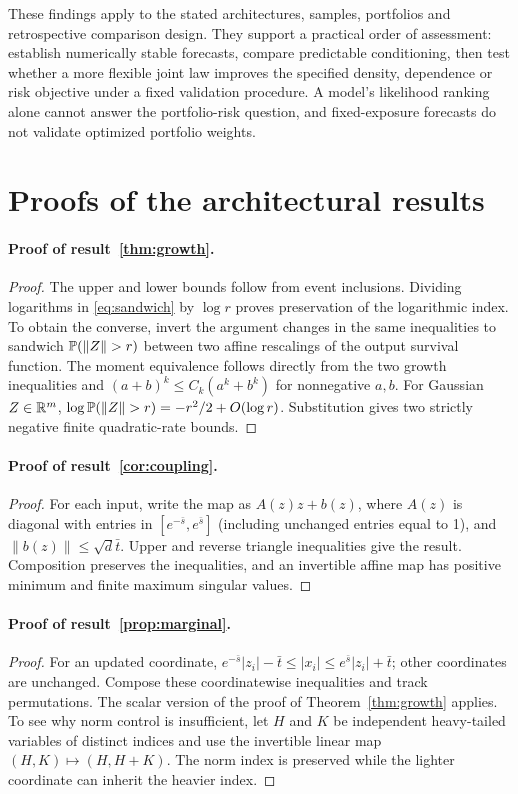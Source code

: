 \documentclass[11pt]{article}
\theoremstyle{definition}\newtheorem{definition}[theorem]{Definition}
\theoremstyle{remark}\newtheorem{remark}[theorem]{Remark}
\begin{document}
These findings apply to the stated architectures, samples, portfolios and retrospective comparison design. They support a practical order of assessment: establish numerically stable forecasts, compare predictable conditioning, then test whether a more flexible joint law improves the specified density, dependence or risk objective under a fixed validation procedure. A model's likelihood ranking alone cannot answer the portfolio-risk question, and fixed-exposure forecasts do not validate optimized portfolio weights.

\appendix
\section{Proofs of the architectural results}\label{app:proofs}
\paragraph{Proof of result~\ref{thm:growth}.}
\begin{proof}
The upper and lower bounds follow from event inclusions. Dividing logarithms in \eqref{eq:sandwich} by $\log r$ proves preservation of the logarithmic index. To obtain the converse, invert the argument changes in the same inequalities to sandwich $\Prob(\|Z\|>r)$ between two affine rescalings of the output survival function. The moment equivalence follows directly from the two growth inequalities and $(a+b)^k\le C_k(a^k+b^k)$ for nonnegative $a,b$. For Gaussian $Z\in\mathbb R^m$, $\log\Prob(\|Z\|>r)=-r^2/2+O(\log r)$. Substitution gives two strictly negative finite quadratic-rate bounds.
\end{proof}

\paragraph{Proof of result~\ref{cor:coupling}.}
\begin{proof}
For each input, write the map as $A(z)z+b(z)$, where $A(z)$ is diagonal with entries in $[e^{-\bar s},e^{\bar s}]$ (including unchanged entries equal to 1), and $\|b(z)\|\le\sqrt d\bar t$. Upper and reverse triangle inequalities give the result. Composition preserves the inequalities, and an invertible affine map has positive minimum and finite maximum singular values.
\end{proof}

\paragraph{Proof of result~\ref{prop:marginal}.}
\begin{proof}
For an updated coordinate, $e^{-\bar s}|z_i|-\bar t\le|x_i|\le e^{\bar s}|z_i|+\bar t$; other coordinates are unchanged. Compose these coordinatewise inequalities and track permutations. The scalar version of the proof of Theorem~\ref{thm:growth} applies. To see why norm control is insufficient, let $H$ and $K$ be independent heavy-tailed variables of distinct indices and use the invertible linear map $(H,K)\mapsto(H,H+K)$. The norm index is preserved while the lighter coordinate can inherit the heavier index.
\end{proof}
\end{document}
